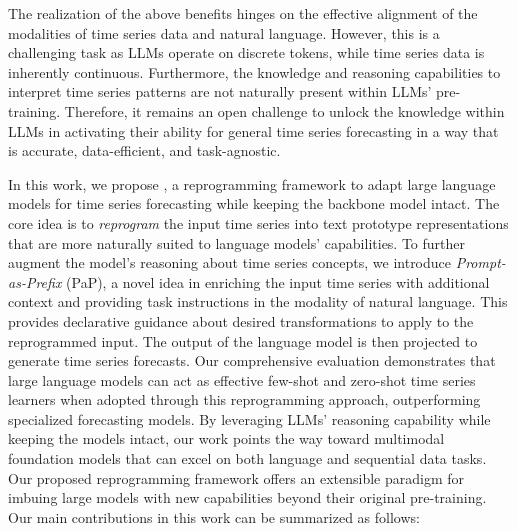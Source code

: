 The realization of the above benefits hinges on the effective alignment of the modalities of time series data and natural language. However, this is a challenging task as LLMs operate on discrete tokens, while time series data is inherently continuous. Furthermore, the knowledge and reasoning capabilities to interpret time series patterns are not naturally present within LLMs' pre-training. Therefore, it remains an open challenge to unlock the knowledge within LLMs in activating their ability for general time series forecasting in a way that is accurate, data-efficient, and task-agnostic. 

In this work, we propose \method, a reprogramming framework to adapt large language models for time series forecasting while keeping the backbone model intact. The core idea is to \textit{reprogram} the input time series into text prototype representations that are more naturally suited to language models' capabilities. To further augment the model's reasoning about time series concepts, we introduce \textit{Prompt-as-Prefix} (PaP), a novel idea in enriching the input time series with additional context and providing task instructions in the modality of natural language. This provides declarative guidance about desired transformations to apply to the reprogrammed input.
The output of the language model is then projected to generate time series forecasts. Our comprehensive evaluation demonstrates that large language models can act as effective few-shot and zero-shot time series learners when adopted through this reprogramming approach, outperforming specialized forecasting models. By leveraging LLMs' reasoning capability while keeping the models intact, our work points the way toward multimodal foundation models that can excel on both language and sequential data tasks. Our proposed reprogramming framework offers an extensible paradigm for imbuing large models with new capabilities beyond their original pre-training. Our main contributions in this work can be summarized as follows:


